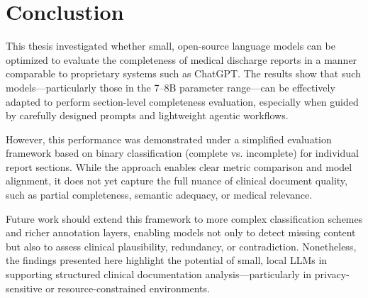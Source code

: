 \section{Conclustion}
This thesis investigated whether small, open-source language models can be optimized to evaluate the completeness of medical discharge reports in a manner comparable to proprietary systems such as ChatGPT. The results show that such models—particularly those in the 7–8B parameter range—can be effectively adapted to perform section-level completeness evaluation, especially when guided by carefully designed prompts and lightweight agentic workflows.

However, this performance was demonstrated under a simplified evaluation framework based on binary classification (complete vs. incomplete) for individual report sections. While the approach enables clear metric comparison and model alignment, it does not yet capture the full nuance of clinical document quality, such as partial completeness, semantic adequacy, or medical relevance.

Future work should extend this framework to more complex classification schemes and richer annotation layers, enabling models not only to detect missing content but also to assess clinical plausibility, redundancy, or contradiction. Nonetheless, the findings presented here highlight the potential of small, local LLMs in supporting structured clinical documentation analysis—particularly in privacy-sensitive or resource-constrained environments.

